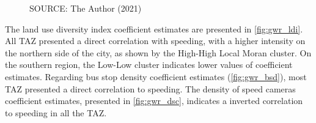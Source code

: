 \begin{figure}[!htbp]
\begin{subfigure}{0.5\textwidth}
    \end{subfigure}    
    \label{fig:gwr_dcsu}
    \par SOURCE: The Author (2021)
\end{figure}

The land use diversity index coefficient estimates are presented in \autoref{fig:gwr_ldi}. All TAZ presented a direct correlation with speeding, with a higher intensity on the northern side of the city, as shown by the High-High Local Moran cluster. On the southern region, the Low-Low cluster indicates lower values of coefficient estimates. Regarding bus stop density coefficient estimates (\autoref{fig:gwr_bsd}), most TAZ presented a direct correlation to speeding. The density of speed cameras coefficient estimates, presented in \autoref{fig:gwr_dsc}, indicates a inverted correlation to speeding in all the TAZ. 

